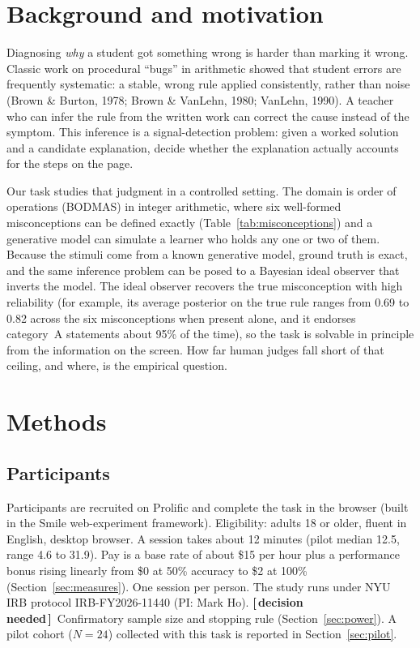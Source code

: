 \documentclass[11pt]{article}
\newcommand{\decflag}{{\small\textbf{\textcolor{decisioncol}{[\,decision needed\,]}}}\ }
\begin{document}
\section{Background and motivation}

Diagnosing \emph{why} a student got something wrong is harder than marking it wrong. Classic
work on procedural ``bugs'' in arithmetic showed that student errors are frequently systematic:
a stable, wrong rule applied consistently, rather than noise (Brown \& Burton, 1978; Brown \&
VanLehn, 1980; VanLehn, 1990). A teacher who can infer the rule from the written work can
correct the cause instead of the symptom. This inference is a signal-detection problem: given a
worked solution and a candidate explanation, decide whether the explanation actually accounts
for the steps on the page.

Our task studies that judgment in a controlled setting. The domain is order of operations
(BODMAS) in integer arithmetic, where six well-formed misconceptions can be defined exactly
(Table~\ref{tab:misconceptions}) and a generative model can simulate a learner who holds any
one or two of them. Because the stimuli come from a known generative model, ground truth is
exact, and the same inference problem can be posed to a Bayesian ideal observer that inverts
the model. The ideal observer recovers the true misconception with high reliability (for
example, its average posterior on the true rule ranges from 0.69 to 0.82 across the six
misconceptions when present alone, and it endorses category~A statements about 95\% of the
time), so the task is solvable in principle from the information on the screen. How far human
judges fall short of that ceiling, and where, is the empirical question.

\section{Methods}\label{sec:methods}

\subsection{Participants}\label{sec:participants}

Participants are recruited on Prolific and complete the task in the browser (built in the
Smile web-experiment framework). Eligibility: adults 18 or older, fluent in English, desktop
browser. A session takes about 12 minutes (pilot median 12.5, range 4.6 to 31.9). Pay is a
base rate of about \$15 per hour plus a performance bonus rising linearly from \$0 at 50\%
accuracy to \$2 at 100\% (Section~\ref{sec:measures}). One session per person. The study runs
under NYU IRB protocol IRB-FY2026-11440 (PI: Mark Ho). \decflag Confirmatory sample size and
stopping rule (Section~\ref{sec:power}). A pilot cohort ($N = 24$) collected with this task is
reported in Section~\ref{sec:pilot}.
\end{document}
